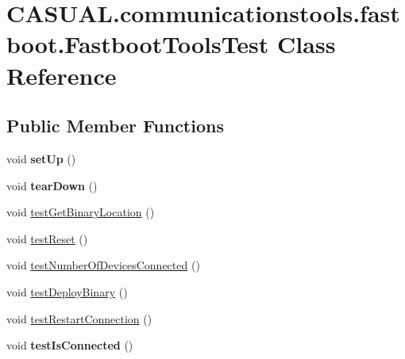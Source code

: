 \hypertarget{class_c_a_s_u_a_l_1_1communicationstools_1_1fastboot_1_1_fastboot_tools_test}{\section{C\-A\-S\-U\-A\-L.\-communicationstools.\-fastboot.\-Fastboot\-Tools\-Test Class Reference}
\label{class_c_a_s_u_a_l_1_1communicationstools_1_1fastboot_1_1_fastboot_tools_test}
}
\subsection*{Public Member Functions}
\begin{DoxyCompactItemize}
\item 
\hypertarget{class_c_a_s_u_a_l_1_1communicationstools_1_1fastboot_1_1_fastboot_tools_test_a7374283ec823cbe7b57f1d8a8c381c2b}{void {\bfseries set\-Up} ()}\label{class_c_a_s_u_a_l_1_1communicationstools_1_1fastboot_1_1_fastboot_tools_test_a7374283ec823cbe7b57f1d8a8c381c2b}

\item 
\hypertarget{class_c_a_s_u_a_l_1_1communicationstools_1_1fastboot_1_1_fastboot_tools_test_a9dd0ce5385066a7a74c2495b600fbf48}{void {\bfseries tear\-Down} ()}\label{class_c_a_s_u_a_l_1_1communicationstools_1_1fastboot_1_1_fastboot_tools_test_a9dd0ce5385066a7a74c2495b600fbf48}

\item 
void \hyperlink{class_c_a_s_u_a_l_1_1communicationstools_1_1fastboot_1_1_fastboot_tools_test_a0bf2ab58941d8359c5f3dc2cb639727f}{test\-Get\-Binary\-Location} ()
\item 
void \hyperlink{class_c_a_s_u_a_l_1_1communicationstools_1_1fastboot_1_1_fastboot_tools_test_a4223d89ba738049e83331efecdab65a1}{test\-Reset} ()
\item 
void \hyperlink{class_c_a_s_u_a_l_1_1communicationstools_1_1fastboot_1_1_fastboot_tools_test_aa45948d58fe468a16cb8553815c6ced5}{test\-Number\-Of\-Devices\-Connected} ()
\item 
void \hyperlink{class_c_a_s_u_a_l_1_1communicationstools_1_1fastboot_1_1_fastboot_tools_test_aad6da8a39483eb70b30c824bc6a71365}{test\-Deploy\-Binary} ()
\item 
void \hyperlink{class_c_a_s_u_a_l_1_1communicationstools_1_1fastboot_1_1_fastboot_tools_test_a3c42a7df6b55a4f6cbeaeeaf57397254}{test\-Restart\-Connection} ()
\item 
\hypertarget{class_c_a_s_u_a_l_1_1communicationstools_1_1fastboot_1_1_fastboot_tools_test_af3ce5414d89ef6583ba0306ff6436654}{void {\bfseries test\-Is\-Connected} ()}\label{class_c_a_s_u_a_l_1_1communicationstools_1_1fastboot_1_1_fastboot_tools_test_af3ce5414d89ef6583ba0306ff6436654}


\end{DoxyCompactItemize}
